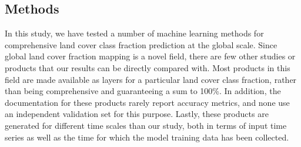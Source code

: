\documentclass[review,authoryear,3p]{elsarticle}
\begin{document}

\subsection{Methods}

In this study, we have tested a number of machine learning methods for comprehensive land cover class fraction prediction at the global scale.
Since global land cover fraction mapping is a novel field, there are few other studies or products that our results can be directly compared with.
Most products in this field are made available as layers for a particular land cover class fraction, rather than being comprehensive and guaranteeing a sum to 100\%.
In addition, the documentation for these products rarely report accuracy metrics, and none use an independent validation set for this purpose.
Lastly, these products are generated for different time scales than our study, both in terms of input time series as well as the time for which the model training data has been collected.
\end{document}
